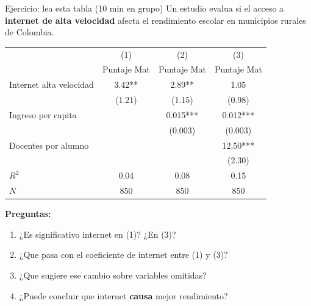 \documentclass[aspectratio=169, 11pt]{beamer}
\begin{document}

\begin{frame}{Ejercicio: lea esta tabla (10 min en grupo)}
\small
Un estudio evalua si el acceso a \textbf{internet de alta velocidad} afecta el rendimiento escolar en municipios rurales de Colombia.

\vspace{0.1cm}
\begin{center}
\footnotesize
\begin{tabular}{lccc}
\toprule
& (1) & (2) & (3) \\
& Puntaje Mat & Puntaje Mat & Puntaje Mat \\
\midrule
Internet alta velocidad & 3.42** & 2.89** & 1.05 \\
& (1.21) & (1.15) & (0.98) \\[3pt]
Ingreso per capita & & 0.015*** & 0.012*** \\
& & (0.003) & (0.003) \\[3pt]
Docentes por alumno & & & 12.50*** \\
& & & (2.30) \\[3pt]
\midrule
$R^2$ & 0.04 & 0.08 & 0.15 \\
$N$ & 850 & 850 & 850 \\
\bottomrule
\end{tabular}
\end{center}

\textbf{Preguntas:}
\begin{enumerate}\setlength{\itemsep}{1pt}
  \item ¿Es significativo internet en (1)? ¿En (3)?
  \item ¿Que pasa con el coeficiente de internet entre (1) y (3)?
  \item ¿Que sugiere ese cambio sobre variables omitidas?
  \item ¿Puede concluir que internet \textbf{causa} mejor rendimiento?
\end{enumerate}
\end{frame}
\end{document}
